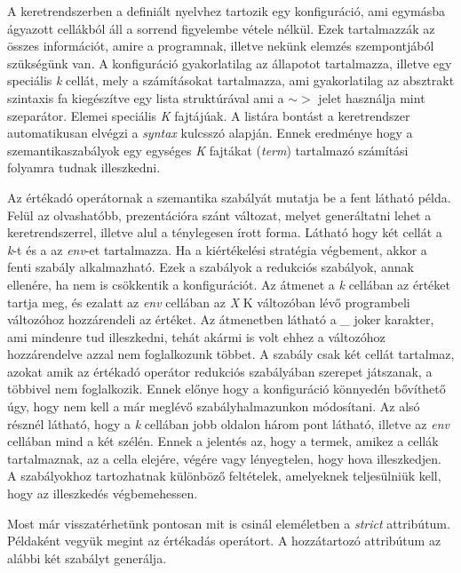 

A keretrendszerben a definiált nyelvhez tartozik egy konfiguráció, ami egymásba ágyazott cellákból áll a sorrend figyelembe vétele nélkül. Ezek tartalmazzák az összes információt, amire a programnak, illetve nekünk elemzés szempontjából szükségünk van. A konfiguráció gyakorlatilag az állapotot tartalmazza, illetve egy speciális \textit{k} cellát, mely a számításokat tartalmazza, ami gyakorlatilag az absztrakt szintaxis fa kiegészítve egy lista struktúrával ami a $\sim>$ jelet használja mint szeparátor. Elemei speciális \textit{K} fajtájúak. A listára bontást a keretrendszer automatikusan elvégzi a \textit{syntax} kulcsszó alapján. Ennek eredménye hogy a szemantikaszabályok egy egységes \textit{K} fajtákat (\textit{term}) tartalmazó számítási folyamra tudnak illeszkedni.




Az értékadó operátornak a szemantika szabályát mutatja be a fent látható példa. Felül az olvashatóbb, prezentációra szánt változat, melyet generáltatni lehet a keretrendszerrel, illetve alul a ténylegesen írott forma. Látható hogy két cellát a \textit{k}-t és a az \textit{env}-et tartalmazza. Ha a kiértékelési stratégia végbement, akkor a fenti szabály alkalmazható. Ezek a szabályok a redukciós szabályok, annak ellenére, ha nem is csökkentik a konfigurációt. Az átmenet a \textit{k} cellában az értéket tartja meg, és ezalatt az \textit{env} cellában az \textit{X} K változóban lévő programbeli változóhoz hozzárendeli az értéket. Az átmenetben látható a \textit{\_} joker karakter, ami mindenre tud illeszkedni, tehát akármi is volt ehhez a változóhoz hozzárendelve azzal nem foglalkozunk többet. A szabály csak két cellát tartalmaz, azokat amik az értékadó operátor redukciós szabályában szerepet játszanak, a többivel nem foglalkozik. Ennek előnye hogy a konfiguráció könnyedén bővíthető úgy, hogy nem kell a már meglévő szabályhalmazunkon módosítani. Az alsó résznél látható, hogy a \textit{k} cellában jobb oldalon három pont látható, illetve az \textit{env} cellában mind a két szélén. Ennek a jelentés az, hogy a termek, amikez a cellák tartalmaznak, az a cella elejére, végére vagy lényegtelen, hogy hova illeszkedjen. A szabályokhoz tartozhatnak különböző feltételek, amelyeknek teljesülniük kell, hogy az illeszkedés végbemehessen.

Most már visszatérhetünk pontosan mit is csinál eleméletben a \textit{strict} attribútum. Példaként vegyük megint az értékadás operátort. A hozzátartozó attribútum az alábbi két szabályt generálja.

